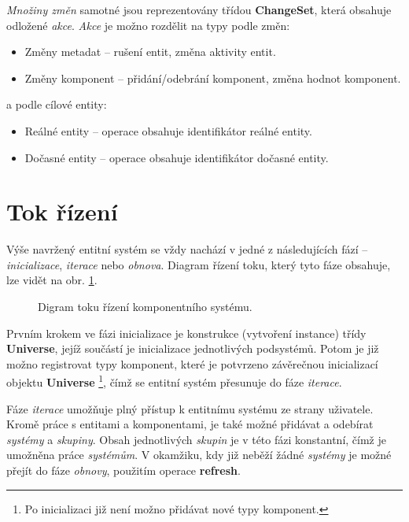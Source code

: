 \emph{Množiny změn} samotné jsou reprezentovány třídou \textbf{ChangeSet}, která obsahuje odložené \emph{akce}. \emph{Akce} je možno rozdělit na typy podle změn:
\begin{itemize}
	\item Změny metadat -- rušení entit, změna aktivity entit.
	\item Změny komponent -- přidání/odebrání komponent, změna hodnot komponent.
\end{itemize}
\noindent a podle cílové entity: 
\begin{itemize}
	\item Reálné entity -- operace obsahuje identifikátor reálné entity.
	\item Dočasné entity -- operace obsahuje identifikátor dočasné entity.
\end{itemize}

\section{Tok řízení}

Výše navržený entitní systém se vždy nachází v jedné z následujících fází -- \emph{inicializace}, \emph{iterace} nebo \emph{obnova}. Diagram řízení toku, který tyto fáze obsahuje, lze vidět na obr. \ref{Fig:DESFlow}.

\begin{figure}[H]
	\begin{center}
	\end{center}
	\caption{Digram toku řízení komponentního systému.}
	\label{Fig:DESFlow}
\end{figure}

Prvním krokem ve fázi inicializace je konstrukce (vytvoření instance) třídy \textbf{Universe}, jejíž součástí je inicializace jednotlivých podsystémů. Potom je již možno registrovat typy komponent, které je potvrzeno závěrečnou inicializací objektu \textbf{Universe} \footnote{Po inicializaci již není možno přidávat nové typy komponent.}, čímž se entitní systém přesunuje do fáze \emph{iterace}. 

Fáze \emph{iterace} umožňuje plný přístup k entitnímu systému ze strany uživatele. Kromě práce s entitami a komponentami, je také možné přidávat a odebírat \emph{systémy} a \emph{skupiny}. Obsah jednotlivých \emph{skupin} je v této fázi konstantní, čímž je umožněna práce \emph{systémům}. V okamžiku, kdy již neběží žádné \emph{systémy} je možné přejít do fáze \emph{obnovy}, použitím operace \textbf{refresh}.


